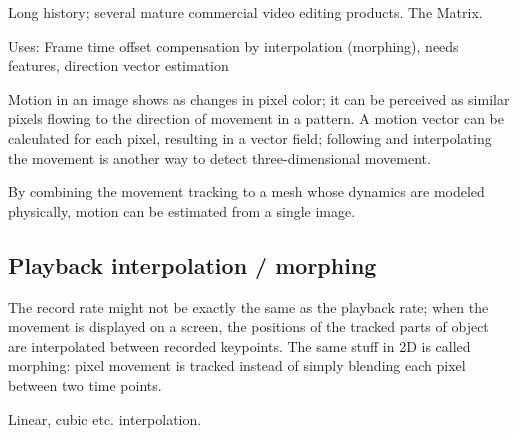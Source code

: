Long history; several mature commercial video editing products. The Matrix.

Uses: Frame time offset compensation by interpolation (morphing), needs features, direction vector estimation

Motion in an image shows as changes in pixel color; it can be perceived as similar pixels flowing to the direction of movement in a pattern.
A motion vector can be calculated for each pixel, resulting in a vector field; following and interpolating the movement is another way to detect three-dimensional movement.
\cite{gibson1950perception,horn1981determining,beauchemin1995computation}

By combining the movement tracking to a mesh whose dynamics are modeled physically, motion can be estimated from a single image.
\cite{decarlo1996integration}



\subsection{Playback interpolation / morphing} %

The record rate might not be exactly the same as the playback rate; when the movement is displayed on a screen, the positions of the tracked parts of object are interpolated between recorded keypoints.
The same stuff in 2D is called morphing: pixel movement is tracked instead of simply blending each pixel between two time points.

Linear, cubic etc. interpolation.

